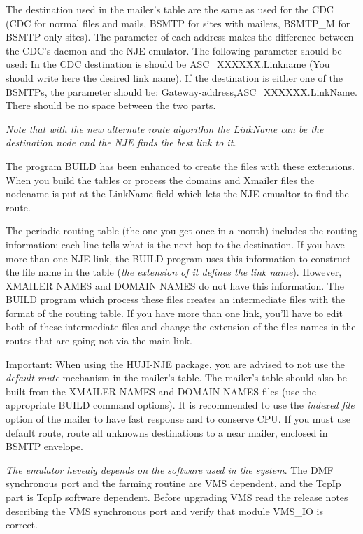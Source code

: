 The  destination  used in the mailer's table are the same as used for
the CDC (CDC for normal files and mails, BSMTP for sites  with  mailers,
BSMTP\_M  for  BSMTP only sites). The parameter of each address makes the
difference between the CDC's daemon and the NJE emulator. The  following
parameter   should  be  used:  In  the  CDC  destination  is  should  be
ASC\_XXXXXX.Linkname (You should write here the desired  link  name).  If
the destination is either one of the BSMTPs, the parameter should be:
Gateway-address,ASC\_XXXXXX.LinkName.  There  should  be no space between
the two parts.

{\sl Note that with the new alternate route algorithm the LinkName can  be
the destination node and the NJE finds the best link to it.}

The  program  BUILD  has been enhanced to create the files with these
extensions. When you build the tables or process the domains and Xmailer
files  the  nodename  is  put  at  the LinkName field which lets the NJE
emualtor to find the route.

The periodic routing table (the one you get once in a month) includes
the  routing  information:  each  line tells what is the next hop to the
destination. If you have more than one NJE link, the BUILD program  uses
this  information to construct the file name in the table ({\sl the extension
of it defines the link name}). However, XMAILER NAMES and DOMAIN NAMES do
not  have  this information. The BUILD program which process these files
creates an intermediate files with the format of the routing  table.  If
you  have  more  than  one  link,  you'll  have  to  edit  both of these
intermediate files and change the extension of the files  names  in  the
routes that are going not via the main link.

{\ncrBold Important}: When using the HUJI-NJE package, you are advised
to not use
the {\sl default route} mechanism in the mailer's table.  The  mailer's  table
should  also be built from the XMAILER NAMES and DOMAIN NAMES files (use
the appropriate BUILD command options). It is  recommended  to  use  the
{\sl indexed file} option of the mailer to have fast response and to conserve
CPU. If you must use default route, route all unknowns destinations to a
near mailer, enclosed in BSMTP envelope.

\vfill\eject


{\sl The  emulator hevealy depends on the software used in the system}. The
DMF synchronous port and the farming routine are VMS dependent, and  the
TcpIp  part  is  TcpIp software dependent.
{\ncrBold Before upgrading VMS} read the
release notes describing the VMS synchronous port and verify that module
VMS\_IO is correct.

